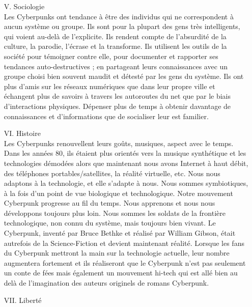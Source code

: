 \documentclass[11pt,twoside,a4paper]{book}
\begin{document}
\begin{enumerate}
	\item[V.] Sociologie ~\\
		Les Cyberpunks ont tendance {\`a} {\^e}tre des individus qui ne correspondent {\`a} aucun syst{\`e}me ou groupe. Ils sont pour la plupart des gens tr{\`e}s intelligents, qui voient au-del{\`a} de l'explicite. Ils rendent compte de l'absurdit{\'e} de la culture, la parodie, l'{\'e}crase et la transforme. Ils utilisent les outils de la soci{\'e}t{\'e} pour t{\'e}moigner contre elle, pour documenter et rapporter ses tendances auto-destructives ; en partageant leurs connaissances avec un groupe choisi bien souvent maudit et d{\'e}test{\'e} par les gens du syst{\`e}me. Ils ont plus d'amis sur les r{\'e}seaux num{\'e}riques que dans leur propre ville et {\'e}changent plus de savoirs {\`a} travers les autoroutes du net que par le biais d'interactions physiques. D{\'e}penser plus de temps {\`a} obtenir davantage de connaissances et d'informations que de socialiser leur est familier.
	\item[VI.] Histoire ~\\
		Les Cyberpunks renouvellent leurs go{\^u}ts, musiques, aspect avec le temps. Dans les ann{\'e}es 80, ils {\'e}taient plus orient{\'e}s vers la musique synth{\'e}tique et les technologies d{\'e}mod{\'e}es alors que maintenant nous avons Internet {\`a} haut d{\'e}bit, des t{\'e}l{\'e}phones portables/satellites, la r{\'e}alit{\'e} virtuelle, etc. Nous nous adaptons {\`a} la technologie, et elle s'adapte {\`a} nous. Nous sommes symbiotiques, {\`a} la fois d'un point de vue biologique et technologique. Notre mouvement Cyberpunk progresse au fil du temps. Nous apprenons et nous nous d{\'e}veloppons toujours plus loin. Nous sommes les soldats de la fronti{\`e}re technologique, non connu du syst{\`e}me, mais toujours bien vivant. Le Cyberpunk, invent{\'e} par Bruce Bethke et r{\'e}alis{\'e} par William Gibson, {\'e}tait autrefois de la Science-Fiction et devient maintenant r{\'e}alit{\'e}. Lorsque les fans du Cyberpunk mettront la main sur la technologie actuelle, leur nombre augmentera fortement et ils r{\'e}aliseront que le Cyberpunk n'est pas seulement un conte de f{\'e}es mais {\'e}galement un mouvement hi-tech qui est all{\'e} bien au del{\`a} de l'imagination des auteurs originels de romans Cyberpunk.
	\item[VII.] Libert{\'e} ~\\

\end{enumerate}
\end{document}

